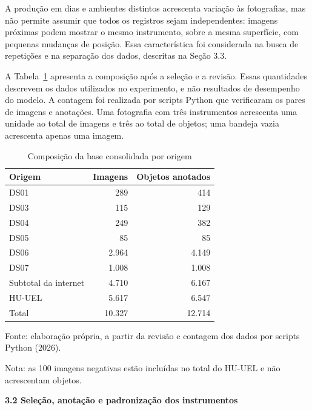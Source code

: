 A produção em dias e ambientes distintos acrescenta variação às fotografias, mas não permite assumir que todos os registros sejam independentes: imagens próximas podem mostrar o mesmo instrumento, sobre a mesma superfície, com pequenas mudanças de posição. Essa característica foi considerada na busca de repetições e na separação dos dados, descritas na Seção 3.3.

A Tabela~\ref{tab:met-origens} apresenta a composição após a seleção e a revisão. Essas quantidades descrevem os dados utilizados no experimento, e não resultados de desempenho do modelo. A contagem foi realizada por scripts Python que verificaram os pares de imagens e anotações. Uma fotografia com três instrumentos acrescenta uma unidade ao total de imagens e três ao total de objetos; uma bandeja vazia acrescenta apenas uma imagem.

\begin{table}[htbp]
\centering
\begin{minipage}{0.92\linewidth}
\singlespacing\small
\caption{Composição da base consolidada por origem}
\label{tab:met-origens}
\centering
\begin{tabular}{lrr}
\hline
Origem & Imagens & Objetos anotados \\
\hline
DS01 & 289 & 414 \\
DS03 & 115 & 129 \\
DS04 & 249 & 382 \\
DS05 & 85 & 85 \\
DS06 & 2.964 & 4.149 \\
DS07 & 1.008 & 1.008 \\
Subtotal da internet & 4.710 & 6.167 \\
HU-UEL & 5.617 & 6.547 \\
\hline
Total & 10.327 & 12.714 \\
\hline
\end{tabular}\par
\vspace{0.35em}\raggedright
Fonte: elaboração própria, a partir da revisão e contagem dos dados por scripts Python (2026).\par
Nota: as 100 imagens negativas estão incluídas no total do HU-UEL e não acrescentam objetos.
\end{minipage}
\end{table}

\vspace{\baselineskip}
{}
\noindent\textbf{3.2 Seleção, anotação e padronização dos instrumentos}\par
\nobreak\vspace{\baselineskip}\nobreak

